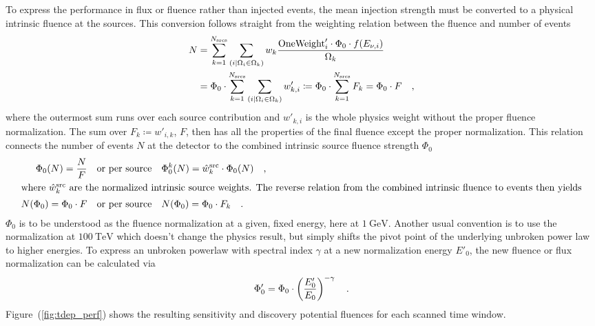 To express the performance in flux or fluence rather than injected events, the mean injection strength must be converted to a physical intrinsic fluence at the sources.
This conversion follows straight from the weighting relation between the fluence and number of events
\begin{align}
  \label{equ:raw_flux}
  N &= \sum_{k=1}^{N_\text{srcs}} \sum_{(i|\Omega_i \in \Omega_k)}
    w_k\frac{\text{OneWeight}'_i\cdot\Phi_0\cdot f(E_{\nu,i})}{\Omega_k} \\
  &= \Phi_0 \cdot
      \sum_{k=1}^{N_\text{srcs}}
      \sum_{(i|\Omega_i \in \Omega_k)} w'_{k,i}
  \coloneqq \Phi_0 \cdot \sum_{k=1}^{N_\text{srcs}} F_k = \Phi_0 \cdot F
  \quad\text{,}
\end{align}
where the outermost sum runs over each source contribution and $w'_{k,i}$ is the whole physics weight without the proper fluence normalization.
The sum over $F_k \coloneqq w'_{i,k}$, $F$, then has all the properties of the final fluence except the proper normalization.
This relation connects the number of events $N$ at the detector to the combined intrinsic source fluence strength $\Phi_0$
\begin{align}
  \label{equ:flux_to_mu}
  \Phi_0(N) = \frac{N}{F}
    &\quad\text{or per source}\quad
    \Phi_0^k(N) = \hat{w}_k^\text{src} \cdot \Phi_0(N)
    \quad\text{,} \\
  \intertext{where $\hat{w}_k^\text{src}$ are the normalized intrinsic source weights. The reverse relation from the combined intrinsic fluence to events then yields}
  N(\Phi_0) = \Phi_0 \cdot F
    &\quad\text{or per source}\quad
    N(\Phi_0) = \Phi_0 \cdot F_k
  \quad\text{.}
\end{align}
$\Phi_0$ is to be understood as the fluence normalization at a given, fixed energy, here at $\SI{1}{\GeV}$.
Another usual convention is to use the normalization at $\SI{100}{\TeV}$ which doesn't change the physics result, but simply shifts the pivot point of the underlying unbroken power law to higher energies.
To express an unbroken powerlaw with spectral index $\gamma$ at a new normalization energy $E'_0$, the new fluence or flux normalization can be calculated via
\begin{equation}
  \Phi'_0 = \Phi_0 \cdot \left(\frac{E'_0}{E_0}\right)^{-\gamma}
  \quad\text{.}
\end{equation}
Figure~(\ref{fig:tdep_perf}) shows the resulting sensitivity and discovery potential fluences for each scanned time window.

